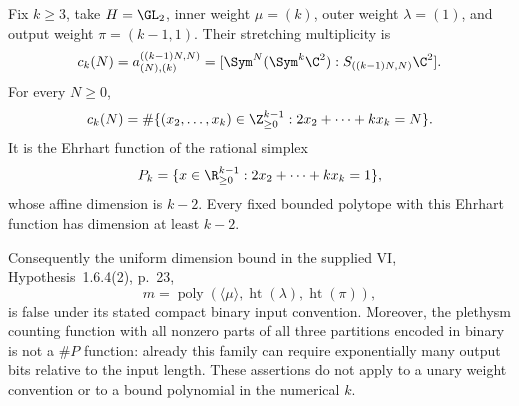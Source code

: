 \begin{finding}\label{f:binarydimension}
Fix $k\ge3$, take $H=\GL_2$, inner weight $\mu=(k)$,
outer weight $\lambda=(1)$, and output weight $\pi=(k-1,1)$.
Their stretching multiplicity is
\[
 c_k(N)=a^{((k-1)N,N)}_{(N),(k)}
       =[\Sym^N(\Sym^k\C^2):S_{((k-1)N,N)}\C^2].
\]
For every $N\ge0$,
\[
 c_k(N)=
 \#\{(x_2,\ldots,x_k)\in\Z_{\ge0}^{k-1}:
                          2x_2+\cdots+kx_k=N\}.
\]
It is the Ehrhart function of the rational simplex
\[
 P_k=\{x\in\R_{\ge0}^{k-1}:2x_2+\cdots+kx_k=1\},
\]
whose affine dimension is $k-2$. Every fixed bounded polytope with this
Ehrhart function has dimension at least $k-2$.

Consequently the uniform dimension bound in the supplied
VI, Hypothesis~1.6.4(2), p.~23,
\[
 m=\operatorname{poly}
   (\langle\mu\rangle,\operatorname{ht}(\lambda),
                         \operatorname{ht}(\pi)),
\]
is false under its stated compact binary input convention.
Moreover, the plethysm counting function with all nonzero parts of
all three partitions encoded in binary is not a $\#P$ function:
already this family can require exponentially many output bits
relative to the input length.
These assertions do not apply to a unary weight convention or to
a bound polynomial in the numerical $k$.
\end{finding}
